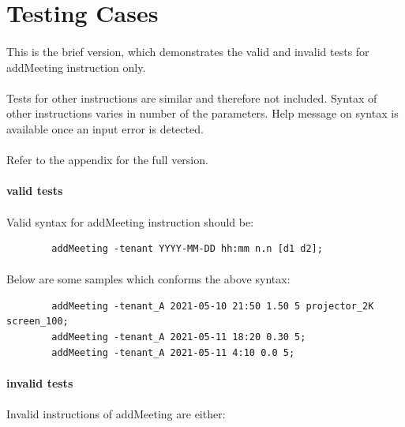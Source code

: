\documentclass{article}
\begin{document}
    \cleardoublepage
    \section{Testing Cases}
        \paragraph{}
        This is the brief version, which demonstrates the valid and invalid tests for addMeeting instruction only.
        \paragraph{}
        Tests for other instructions are similar and therefore not included. Syntax of other instructions varies in number of the parameters. Help message on syntax is available once an input error is detected.
        \paragraph{}
        Refer to the appendix for the full version. 

        \paragraph{valid tests}
        \paragraph{}
        Valid syntax for addMeeting instruction should be:
        \begin{verbatim}
        addMeeting -tenant YYYY-MM-DD hh:mm n.n [d1 d2]; 
        \end{verbatim}
        \paragraph{}
        Below are some samples which conforms the above syntax:
        \begin{verbatim}
        addMeeting -tenant_A 2021-05-10 21:50 1.50 5 projector_2K screen_100;
        addMeeting -tenant_A 2021-05-11 18:20 0.30 5;
        addMeeting -tenant_A 2021-05-11 4:10 0.0 5;
        \end{verbatim}
        
        
        \paragraph{invalid tests}
        \paragraph{}
        Invalid instructions of addMeeting are either:
        
\end{document}
